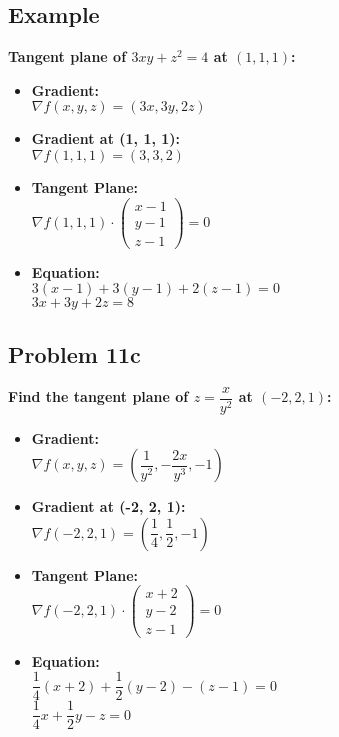\documentclass[11pt]{article}
\begin{document}
\begin{multicols}{2}
    \subsection*{Example}
    \textbf{Tangent plane of \( 3xy + z^2 = 4 \) at \((1, 1, 1)\):}
    \begin{itemize}
        \item \textbf{Gradient:} \\
        \( \nabla f(x, y, z) = (3x, 3y, 2z) \)
        \item \textbf{Gradient at (1, 1, 1):} \\
        \( \nabla f(1, 1, 1) = (3, 3, 2) \)
        \item \textbf{Tangent Plane:} \\
        \( \nabla f(1, 1, 1) \cdot \begin{pmatrix}
        x - 1 \\
        y - 1 \\
        z - 1
        \end{pmatrix} = 0 \)
        \item \textbf{Equation:} \\
        \( 3(x - 1) + 3(y - 1) + 2(z - 1) = 0 \) \\
        \( 3x + 3y + 2z = 8 \)
    \end{itemize}
\columnbreak
    \subsection*{Problem 11c}
    \textbf{Find the tangent plane of \( z = \dfrac{x}{y^2} \) at \((-2, 2, 1)\):}
    \begin{itemize}
        \item \textbf{Gradient:} \\
        \( \nabla f(x, y, z) = \left(\dfrac{1}{y^2}, -\dfrac{2x}{y^3}, -1\right) \)
        \item \textbf{Gradient at (-2, 2, 1):} \\
        \( \nabla f(-2, 2, 1) = \left(\dfrac{1}{4}, \dfrac{1}{2}, -1\right) \)
        \item \textbf{Tangent Plane:} \\
        \( \nabla f(-2, 2, 1) \cdot \begin{pmatrix}
        x + 2 \\
        y - 2 \\
        z - 1
        \end{pmatrix} = 0 \)
        \item \textbf{Equation:} \\
        \( \dfrac{1}{4}(x + 2) + \dfrac{1}{2}(y - 2) - (z - 1) = 0 \) \\
        \( \dfrac{1}{4}x + \dfrac{1}{2}y - z = 0 \)
    \end{itemize}
\end{multicols}
\end{document}
